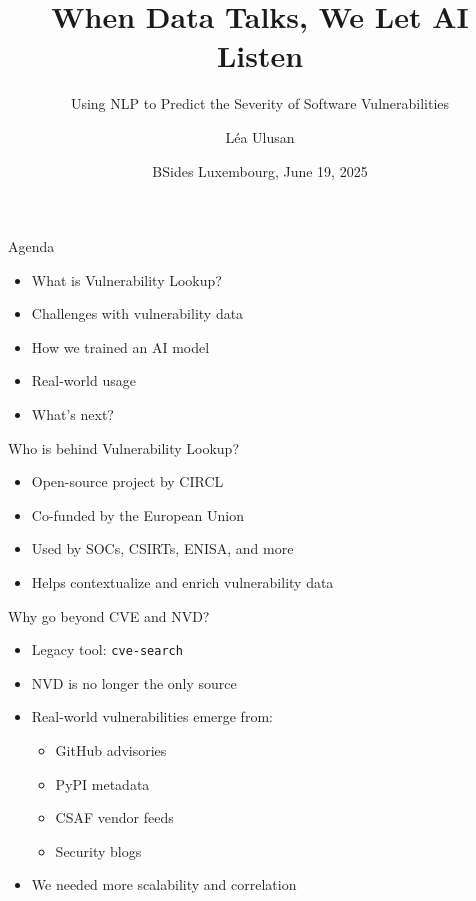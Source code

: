 \documentclass{beamer}
\title{When Data Talks, We Let AI Listen}
\subtitle{Using NLP to Predict the Severity of Software Vulnerabilities}
\author{Léa Ulusan}
\institute{CIRCL - Computer Incident Response Center Luxembourg}
\date{BSides Luxembourg, June 19, 2025}
\begin{document}
\maketitle

\begin{frame}{Agenda}
    \begin{itemize}
        \item What is Vulnerability Lookup?
        \item Challenges with vulnerability data
        \item How we trained an AI model
        \item Real-world usage
        \item What's next?
    \end{itemize}
\end{frame}

\begin{frame}{Who is behind Vulnerability Lookup?}
    \begin{itemize}
        \item Open-source project by CIRCL
        \item Co-funded by the European Union
        \item Used by SOCs, CSIRTs, ENISA, and more
        \item Helps contextualize and enrich vulnerability data
    \end{itemize}
\end{frame}

\begin{frame}{Why go beyond CVE and NVD?}
    \begin{itemize}
        \item Legacy tool: \texttt{cve-search}
        \item NVD is no longer the only source
        \item Real-world vulnerabilities emerge from:
            \begin{itemize}
                \item GitHub advisories
                \item PyPI metadata
                \item CSAF vendor feeds
                \item Security blogs
            \end{itemize}
        \item We needed more scalability and correlation
    \end{itemize}
\end{frame}
\end{document}
